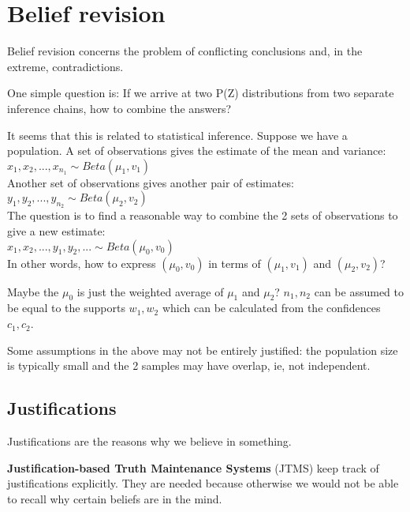 \chapter{Belief revision}
\label{ch:belief-revision}

\minitoc

Belief revision concerns the problem of conflicting conclusions and, in the extreme, contradictions.

One simple question is:  If we arrive at two P(Z) distributions from two separate inference chains, how to combine the answers?

It seems that this is related to statistical inference.  Suppose we have a population.  A set of observations gives the estimate of the mean and variance:\\
\hspace*{1cm} $x_1, x_2, ..., x_{n_1} \sim Beta(\mu_1, v_1)$\\
Another set of observations gives another pair of estimates:\\
\hspace*{1cm} $y_1, y_2, ..., y_{n_2} \sim Beta(\mu_2, v_2)$\\
The question is to find a reasonable way to combine the 2 sets of observations to give a new estimate:\\
\hspace*{1cm} $x_1, x_2, ..., y_1, y_2, ... \sim Beta(\mu_0, v_0)$\\
In other words, how to express $(\mu_0, v_0)$ in terms of $(\mu_1, v_1)$ and $(\mu_2, v_2)$?

Maybe the $\mu_0$ is just the weighted average of $\mu_1$ and $\mu_2$?  $n_1, n_2$ can be assumed to be equal to the supports $w_1, w_2$ which can be calculated from the confidences $c_1, c_2$.

Some assumptions in the above may not be entirely justified:  the population size is typically small and the 2 samples may have overlap, ie, not independent.

\section{Justifications}

Justifications are the reasons why we believe in something.

\textbf{Justification-based Truth Maintenance Systems} (JTMS) keep track of justifications explicitly.  They are needed because otherwise we would not be able to recall why certain beliefs are in the mind.

